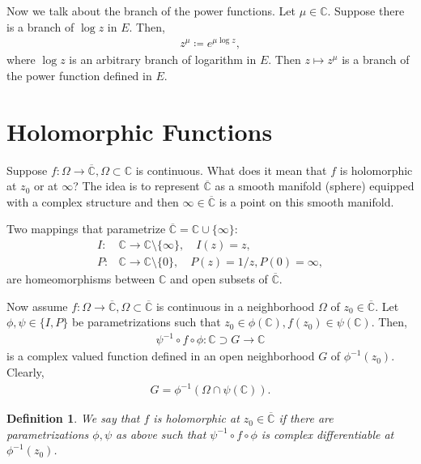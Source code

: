 \documentclass[11pt]{book}
\newtheorem{definition}{Definition}[chapter]
\theoremstyle{definition}
\numberwithin{equation}{chapter}
\begin{document}
\medskip

Now we talk about the branch of the power functions. Let $\mu \in \mathbb{C}$. Suppose there is a branch of $\log z$ in $E$. Then, 
\begin{align*}
    z^\mu \coloneqq e^{\mu \log z},
\end{align*}
where $\log z$ is an arbitrary branch of logarithm in $E$. Then $z \mapsto z^\mu$ is a branch of the power function defined in $E$. 

\medskip

\section{Holomorphic Functions}

Suppose $f: \Omega \to \overline{\mathbb{C}}, \Omega \subset \mathbb{C}$ is continuous. What does it mean that $f$ is holomorphic at $z_0$ or at $\infty$? The idea is to represent $\overline{\mathbb{C}}$ as a smooth manifold (sphere) equipped with a complex structure and then $\infty \in \overline{\mathbb{C}}$ is a point on this smooth manifold.  

Two mappings that parametrize $\overline{\mathbb{C}} = \mathbb{C} \cup \{\infty\}$: 
\begin{align*}
    I: & \mathbb{C} \to \mathbb{C}\setminus \{\infty\}, \quad I(z) = z, \\
    P: & \mathbb{C} \to \mathbb{C}\setminus \{0\}, \quad P(z) = 1/z, P(0) = \infty,
\end{align*}
are homeomorphisms between $\mathbb{C}$ and open subsets of $\overline{\mathbb{C}}$.

Now assume $f:\Omega \to \overline{\mathbb{C}}, \Omega \subset \overline{\mathbb{C}}$ is continuous in a neighborhood $\Omega$ of $z_0 \in \overline{\mathbb{C}}$. Let $\phi, \psi \in \{I,P\}$ be parametrizations such that $z_0 \in \phi(\mathbb{C}), f(z_0) \in \psi(\mathbb{C})$. Then,
\begin{align*}
    \psi^{-1} \circ f \circ \phi: \mathbb{C} \supset G \to \mathbb{C}
\end{align*}
is a complex valued function defined in an open neighborhood $G$ of $\phi^{-1}(z_0)$. Clearly, 
\begin{align*}
    G = \phi^{-1}(\Omega \cap \psi(\mathbb{C})).
\end{align*}

\medskip

\begin{definition}
We say that $f$ is holomorphic at $z_0 \in \overline{\mathbb{C}}$ if there are parametrizations $\phi, \psi$ as above such that $\psi^{-1} \circ f \circ \phi$ is complex differentiable at $\phi^{-1}(z_0)$.
\end{definition}
\end{document}
